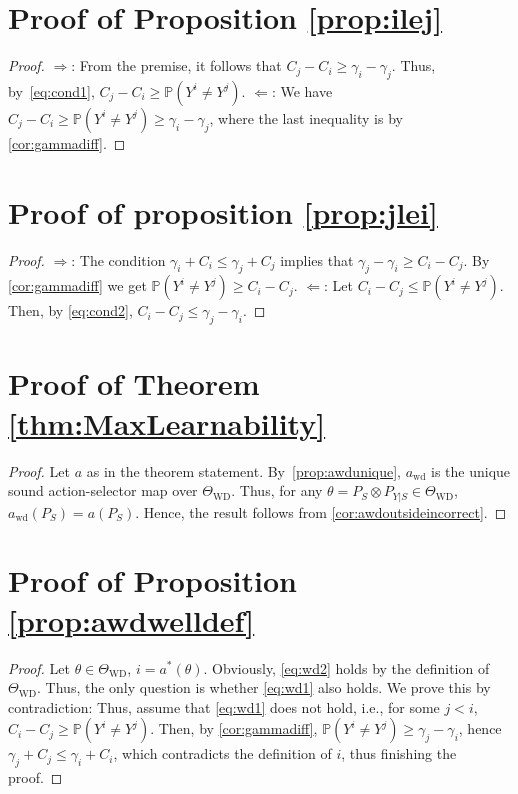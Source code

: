 \documentclass[11pt]{article} %
\newcommand{\WD}{\mathrm{WD}}
\newcommand{\TWD}{\Theta_{\WD}}
\newcommand{\awd}{a_{\mathrm{wd}}}
\newcommand{\Prob}[1]{\mathbb{P}\left(#1\right)}
\begin{document}
\section*{Proof of Proposition \ref{prop:ilej}}
\begin{proof}
	\noindent $\Rightarrow$: From the premise, it follows that $C_j - C_i \ge \gamma_i - \gamma_j$.
	Thus, by~\eqref{eq:cond1}, $C_j - C_i \ge \Prob{Y^i\ne Y^j}$.
	\noindent $\Leftarrow$: We have $C_j - C_i \ge \Prob{Y^i \ne Y^j} \ge \gamma_i -\gamma_j$, where the last
	inequality is by \cref{cor:gammadiff}.
	\end{proof}
\section*{Proof of proposition \ref{prop:jlei}}	
	\begin{proof}
		\noindent $\Rightarrow$: The condition $\gamma_i + C_i \le \gamma_j + C_j$ implies that $\gamma_j -\gamma_i \ge C_i - C_j$.
		By \cref{cor:gammadiff} we get $\Prob{Y^i \ne Y^j} \ge C_i - C_j$.
		\noindent $\Leftarrow$: Let $C_i - C_j \le \Prob{Y^i \ne Y^j}$. Then, by \eqref{eq:cond2}, $C_i - C_j \le \gamma_j - \gamma_i$.
	\end{proof}

\section*{Proof of Theorem \ref{thm:MaxLearnability}}
\begin{proof}
	Let $a$ as in the theorem statement. By~\cref{prop:awdunique}, $\awd$ is the unique sound action-selector map over $\TWD$.
	Thus, for any $\theta = P_S\otimes P_{Y|S}\in \TWD$, $\awd(P_S) = a(P_S)$.
	Hence, the result follows from \cref{cor:awdoutsideincorrect}.
	\end{proof}
	


\section*{Proof of Proposition \ref{prop:awdwelldef}}
\begin{proof}
	Let $\theta\in \TWD$, $i = a^*(\theta)$. Obviously, \eqref{eq:wd2} holds by the definition of $\TWD$.
	Thus, the only question is whether \eqref{eq:wd1} also holds.
	We prove this by contradiction:
	Thus, assume that \eqref{eq:wd1} does not hold, i.e., for some $j<i$, $C_i-C_j \ge \Prob{Y^i \ne Y^j}$. Then, by \cref{cor:gammadiff}, $\Prob{ Y^i \ne Y^j} \ge \gamma_j - \gamma_i$, hence $\gamma_j + C_j \le \gamma_i + C_i$, which contradicts the definition of $i$, thus finishing the proof.
	\end{proof}
\end{document}
